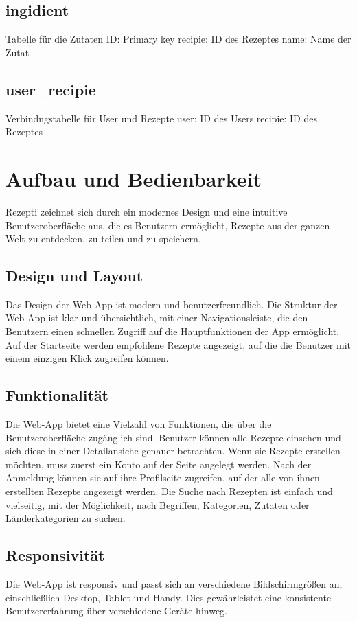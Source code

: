\documentclass{article}
\begin{document}
\subsection{ingidient}
Tabelle für die Zutaten
ID: Primary key
\newline
recipie: ID des Rezeptes
\newline
name: Name der Zutat

\subsection{user\_recipie}
Verbindngstabelle für User und Rezepte
user: ID des Users
\newline
recipie: ID des Rezeptes

\pagebreak

\section{Aufbau und Bedienbarkeit}
Rezepti zeichnet sich durch ein modernes Design und eine intuitive Benutzeroberfläche aus, die es Benutzern ermöglicht, Rezepte aus der ganzen Welt zu entdecken, zu teilen und zu speichern.

\subsection{Design und Layout}
Das Design der Web-App ist modern und benutzerfreundlich. Die Struktur der Web-App ist klar und übersichtlich, mit einer Navigationsleiste, die den Benutzern einen schnellen Zugriff auf die Hauptfunktionen der App ermöglicht. Auf der Startseite werden empfohlene Rezepte angezeigt, auf die die Benutzer mit einem einzigen Klick zugreifen können.

\subsection{Funktionalität}
Die Web-App bietet eine Vielzahl von Funktionen, die über die Benutzeroberfläche zugänglich sind. Benutzer können alle Rezepte einsehen und sich diese in einer Detailansiche genauer betrachten. Wenn sie Rezepte erstellen möchten, muss zuerst ein Konto auf der Seite angelegt werden. Nach der Anmeldung können sie auf ihre Profilseite zugreifen, auf der alle von ihnen  erstellten Rezepte angezeigt werden.  Die Suche nach Rezepten ist einfach und vielseitig, mit der Möglichkeit, nach Begriffen, Kategorien, Zutaten oder Länderkategorien zu suchen.

\subsection{Responsivität}
Die Web-App ist responsiv und passt sich an verschiedene Bildschirmgrößen an, einschließlich Desktop, Tablet und Handy. Dies gewährleistet eine konsistente Benutzererfahrung über verschiedene Geräte hinweg.
\end{document}
